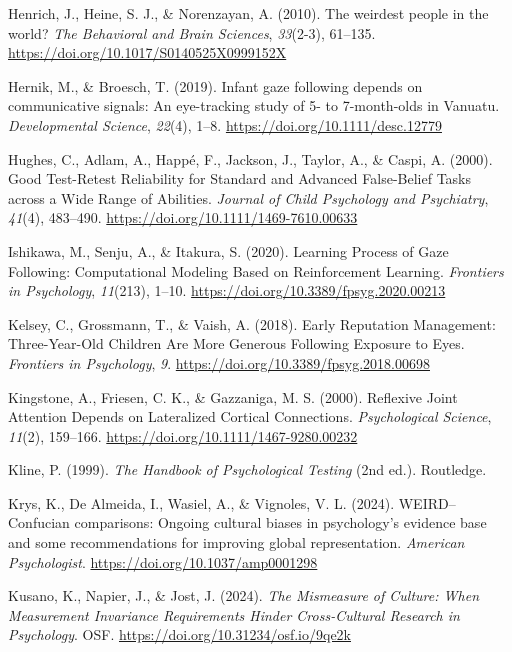 \documentclass[
  man,floatsintext]{apa7}
\newlength{\cslhangindent}
\newenvironment{CSLReferences}[2] %
 {\begin{list}{}{%
  \setlength{\itemindent}{0pt}
  \setlength{\leftmargin}{0pt}
  \setlength{\parsep}{0pt}
  \ifodd #1
   \setlength{\leftmargin}{\cslhangindent}
   \setlength{\itemindent}{-1\cslhangindent}
  \fi
  \setlength{\itemsep}{#2\baselineskip}}}
 {\end{list}}
\begin{document}
\begin{CSLReferences}{1}{0}
Henrich, J., Heine, S. J., \& Norenzayan, A. (2010). The weirdest people in the world? \emph{The Behavioral and Brain Sciences}, \emph{33}(2-3), 61--135. \url{https://doi.org/10.1017/S0140525X0999152X}

Hernik, M., \& Broesch, T. (2019). Infant gaze following depends on communicative signals: {An} eye-tracking study of 5- to 7-month-olds in {Vanuatu}. \emph{Developmental Science}, \emph{22}(4), 1--8. \url{https://doi.org/10.1111/desc.12779}

Hughes, C., Adlam, A., Happé, F., Jackson, J., Taylor, A., \& Caspi, A. (2000). Good {Test}-{Retest Reliability} for {Standard} and {Advanced False}-{Belief Tasks} across a {Wide Range} of {Abilities}. \emph{Journal of Child Psychology and Psychiatry}, \emph{41}(4), 483--490. \url{https://doi.org/10.1111/1469-7610.00633}

Ishikawa, M., Senju, A., \& Itakura, S. (2020). Learning {Process} of {Gaze Following}: {Computational Modeling Based} on {Reinforcement Learning}. \emph{Frontiers in Psychology}, \emph{11}(213), 1--10. \url{https://doi.org/10.3389/fpsyg.2020.00213}

Kelsey, C., Grossmann, T., \& Vaish, A. (2018). Early {Reputation Management}: {Three-Year-Old Children Are More Generous Following Exposure} to {Eyes}. \emph{Frontiers in Psychology}, \emph{9}. \url{https://doi.org/10.3389/fpsyg.2018.00698}

Kingstone, A., Friesen, C. K., \& Gazzaniga, M. S. (2000). Reflexive {Joint Attention Depends} on {Lateralized Cortical Connections}. \emph{Psychological Science}, \emph{11}(2), 159--166. \url{https://doi.org/10.1111/1467-9280.00232}

Kline, P. (1999). \emph{The {Handbook} of {Psychological Testing}} (2nd ed.). Routledge.

Krys, K., De Almeida, I., Wasiel, A., \& Vignoles, V. L. (2024). {WEIRD}--{Confucian} comparisons: {Ongoing} cultural biases in psychology's evidence base and some recommendations for improving global representation. \emph{American Psychologist}. \url{https://doi.org/10.1037/amp0001298}

Kusano, K., Napier, J., \& Jost, J. (2024). \emph{The {Mismeasure} of {Culture}: {When Measurement Invariance Requirements Hinder Cross-Cultural Research} in {Psychology}}. OSF. \url{https://doi.org/10.31234/osf.io/9qe2k}


\end{CSLReferences}
\end{document}
